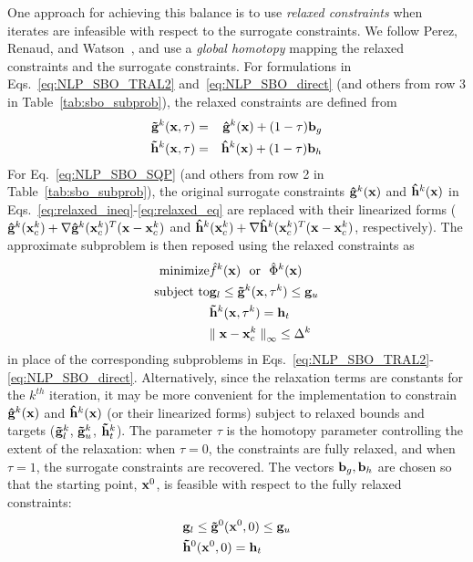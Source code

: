 One approach for achieving this balance is to use {\em relaxed
constraints} when iterates are infeasible with respect to the
surrogate constraints.  We follow Perez, Renaud, and
Watson~\cite{Per04a}, and use a {\em global homotopy} mapping the
relaxed constraints and the surrogate constraints.  For formulations
in Eqs.~\ref{eq:NLP_SBO_TRAL2} and~\ref{eq:NLP_SBO_direct} (and others
from row 3 in Table~\ref{tab:sbo_subprob}), the relaxed constraints
are defined from
\begin{eqnarray}
{\bf {\tilde g}}^k({\bf x}, \tau) &=& {\bf {\hat g}}^k({\bf x}) + 
(1-\tau){\bf b}_{g} \label{eq:relaxed_ineq}\\
{\bf {\tilde h}}^k({\bf x}, \tau) &=& {\bf {\hat h}}^k({\bf x}) + 
(1-\tau){\bf b}_{h} \label{eq:relaxed_eq}
\end{eqnarray}
For Eq.~\ref{eq:NLP_SBO_SQP} (and others from row 2 in
Table~\ref{tab:sbo_subprob}), the original surrogate constraints 
${\bf {\hat g}}^k({\bf x})$ and ${\bf {\hat h}}^k({\bf x})$ in
Eqs.~\ref{eq:relaxed_ineq}-\ref{eq:relaxed_eq} are replaced with 
their linearized forms (${\bf {\hat g}}^k({\bf x}^k_c) + 
\nabla {\bf {\hat g}}^k({\bf x}^k_c)^T ({\bf x} - {\bf x}^k_c)$ 
and ${\bf {\hat h}}^k({\bf x}^k_c) + \nabla {\bf {\hat h}}^k({\bf x}^k_c)^T 
({\bf x} - {\bf x}^k_c)$, respectively).  The approximate subproblem
is then reposed using the relaxed constraints as
\begin{eqnarray}
{\rm minimize } & {\hat f^k}({\bf x})~~{\rm or}~~{\hat \Phi}^k({\bf x})
\nonumber \\
{\rm subject\  to } 
  & {\bf g}_l \le {\bf {\tilde g}}^k({\bf x},\tau^k) \le {\bf g}_u \nonumber \\
  &               {\bf {\tilde h}}^k({\bf x},\tau^k) = {\bf h}_t \nonumber \\
  & {\parallel {\bf x} - {\bf x}^k_c \parallel}_\infty \le \Delta^k
\label{eq:NLP_relaxed}
\end{eqnarray}
in place of the corresponding subproblems in 
Eqs.~\ref{eq:NLP_SBO_TRAL2}-\ref{eq:NLP_SBO_direct}. Alternatively, 
since the relaxation terms are constants for the $k^{th}$ iteration, 
it may be more convenient for the implementation to constrain 
${\bf {\hat g}}^k({\bf x})$ and ${\bf {\hat h}}^k({\bf x})$ (or their
linearized forms) subject to relaxed bounds and targets 
(${\bf {\tilde g}}_l^k$, ${\bf {\tilde g}}_u^k$, ${\bf {\tilde h}}_t^k$).  
The parameter $\tau$ is the homotopy parameter controlling the extent of 
the relaxation: when $\tau=0$, the constraints are fully relaxed, and 
when $\tau=1$, the surrogate constraints are recovered.  The vectors 
${\bf b}_{g}, {\bf b}_{h}$ are chosen so that the starting point, 
${\bf x}^0$, is feasible with respect to the fully relaxed constraints:
\begin{eqnarray}
&{\bf g}_l \le {\bf {\tilde g}}^0({\bf x}^0, 0) \le {\bf g}_u \\
&{\bf {\tilde h}}^0({\bf x}^0, 0) =  {\bf h}_t
\end{eqnarray}

